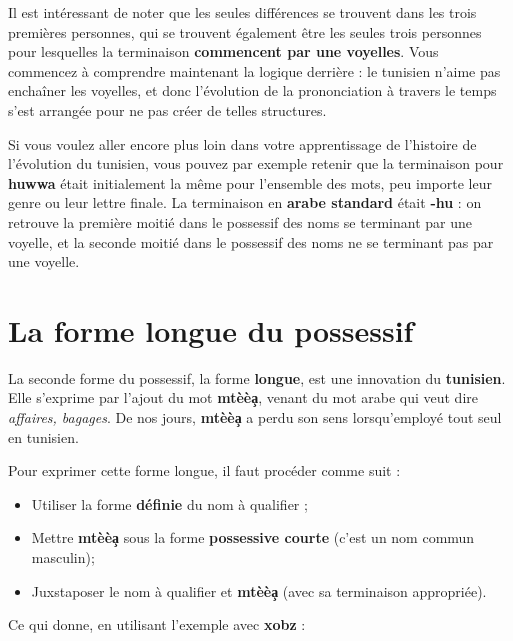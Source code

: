 Il est intéressant de noter que les seules différences se trouvent dans les trois premières personnes, qui se trouvent également être les seules trois personnes pour lesquelles la terminaison \textbf{commencent par une voyelles}. Vous commencez à comprendre maintenant la logique derrière : le tunisien n'aime pas enchaîner les voyelles, et donc l'évolution de la prononciation à travers le temps s'est arrangée pour ne pas créer de telles structures. 

Si vous voulez aller encore plus loin dans votre apprentissage de l'histoire de l'évolution du tunisien, vous pouvez par exemple retenir que la terminaison pour \textbf{huwwa} était initialement la même pour l'ensemble des mots, peu importe leur genre ou leur lettre finale. La terminaison en \textbf{arabe standard} était \textbf{-hu} : on retrouve la première moitié dans le possessif des noms se terminant par une voyelle, et la seconde moitié dans le possessif des noms ne se terminant pas par une voyelle.

\section{La forme longue du possessif}
La seconde forme du possessif, la forme \textbf{longue}, est une innovation du \textbf{tunisien}. Elle s'exprime par l'ajout du mot \textbf{mtèè\c{a}}, venant du mot arabe  qui veut dire \textit{affaires, bagages}. De nos jours, \textbf{mtèè\c{a}} a perdu son sens lorsqu'employé tout seul en tunisien.

Pour exprimer cette forme longue, il faut procéder comme suit : 
\begin{itemize}
    \item Utiliser la forme \textbf{définie} du nom à qualifier ;
    \item Mettre \textbf{mtèè\c{a}} sous la forme \textbf{possessive courte} (c'est un nom commun masculin);
    \item Juxstaposer le nom à qualifier et \textbf{mtèè\c{a}} (avec sa terminaison appropriée).
\end{itemize}

Ce qui donne, en utilisant l'exemple avec \textbf{xobz} : 

